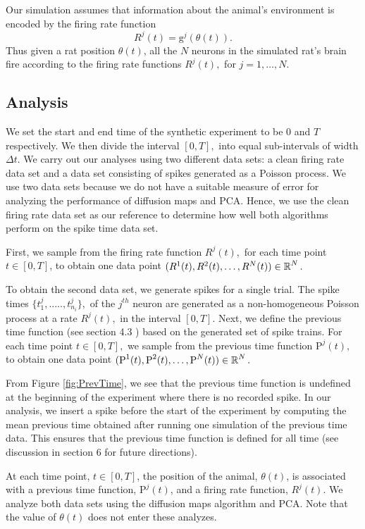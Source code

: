 Our simulation assumes  that information about the animal's environment is  encoded by the firing rate function
$$R^{j}(t) =  \text{g}^{j}(\theta(t)).$$
Thus given a rat position $\theta(t)$, all the $N$ neurons  in the simulated rat's brain fire according to the firing rate functions  $R^{j}(t),$ for $j = 1, \ldots, N.$


\subsection{Analysis}
We set the start  and end time of the synthetic experiment  to be  $0$ and $T$ respectively. We then divide the interval
$[0, T],$ into equal sub-intervals  of width $\Delta t$.
We carry out  our analyses  using two different data sets:  a clean firing rate data set and a data set consisting of spikes generated as a Poisson process.
We use two data sets because we do not have a suitable measure of error for analyzing the performance of diffusion maps
and PCA. Hence, we use the clean firing rate data set as our reference to determine how well both algorithms perform
on the spike time data set.


First, we sample from the firing rate function  $R^{j}(t),$ for each time point $t \in [0, T]$,
to obtain one data point  $(R^{1}(t),  R^{2}(t),    \ldots , R^{N}(t) )  \in \operatorname{\mathbb{R}}^N.$ 


To obtain the second data set, we generate spikes  for a single trial. The spike times $\{t_{1}^{j}, ....., t_{n_{i}}^{j} \},$  of the $j^{th}$ neuron are generated as a non-homogeneous Poisson process at a rate $R^{j}(t),$ in the interval $[0, T].$
Next, we define the previous time function (see section 4.3 )  based on the  generated set of  spike trains.  
For each time point $t \in [0, T],$ we sample from the previous time function $\text{P}^{j}(t),$ to obtain  one data point
$( \text{P}^{1}(t), \text{P}^{2}(t), \ldots, \text{P}^{N}(t) ) \in  \operatorname{\mathbb{R}}^N.$ 


From Figure \ref{fig:PrevTime}, we  see that the previous time function is undefined at the beginning of the experiment where there is no recorded spike. In our analysis, we insert a spike before the start of the experiment by computing the mean previous time obtained after running  one simulation of  the previous time data. This ensures that the previous time function
is defined for all time (see discussion in section 6 for future directions). 


At  each time point, $t  \in [0,T]$, the position of the animal, $\theta(t)$, is associated with a previous time function, $\text{P}^{j}(t)$, and a firing rate function, $R^{j}(t)$. We analyze both data sets using the diffusion maps algorithm  and  PCA. Note that the value of $\theta(t)$ does not enter these analyzes.


